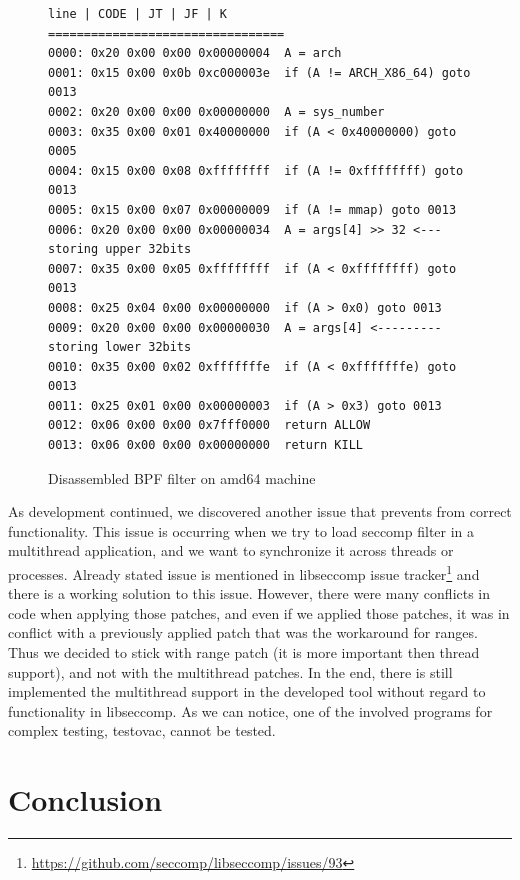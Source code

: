 \begin{figure}[h]
	\label{BPF_rule}
	\lstset{style=npl}
	\begin{lstlisting}
line | CODE | JT | JF | K
=================================
0000: 0x20 0x00 0x00 0x00000004  A = arch
0001: 0x15 0x00 0x0b 0xc000003e  if (A != ARCH_X86_64) goto 0013
0002: 0x20 0x00 0x00 0x00000000  A = sys_number
0003: 0x35 0x00 0x01 0x40000000  if (A < 0x40000000) goto 0005
0004: 0x15 0x00 0x08 0xffffffff  if (A != 0xffffffff) goto 0013
0005: 0x15 0x00 0x07 0x00000009  if (A != mmap) goto 0013
0006: 0x20 0x00 0x00 0x00000034  A = args[4] >> 32 <--- storing upper 32bits
0007: 0x35 0x00 0x05 0xffffffff  if (A < 0xffffffff) goto 0013
0008: 0x25 0x04 0x00 0x00000000  if (A > 0x0) goto 0013
0009: 0x20 0x00 0x00 0x00000030  A = args[4] <--------- storing lower 32bits
0010: 0x35 0x00 0x02 0xfffffffe  if (A < 0xfffffffe) goto 0013
0011: 0x25 0x01 0x00 0x00000003  if (A > 0x3) goto 0013
0012: 0x06 0x00 0x00 0x7fff0000  return ALLOW
0013: 0x06 0x00 0x00 0x00000000  return KILL
	\end{lstlisting}
	\caption{Disassembled BPF filter on amd64 machine}
\end{figure}

As development continued, we discovered another issue that prevents from correct
functionality. This issue is occurring when we try to load seccomp filter in a
multithread application, and we want to synchronize it across threads or
processes. Already stated issue is mentioned in libseccomp issue
tracker\footnote{\url{https://github.com/seccomp/libseccomp/issues/93}} and
there is a working solution to this issue. However, there were many conflicts in
code when applying those patches, and even if we applied those patches, it was
in conflict with a previously applied patch that was the workaround for ranges.
Thus we decided to stick with range patch (it is more important then thread
support), and not with the multithread patches. In the end, there is still
implemented the multithread support in the developed tool without regard to
functionality in libseccomp. As we can notice, one of the involved programs for
complex testing, testovac, cannot be tested.


\chapter{Conclusion}



